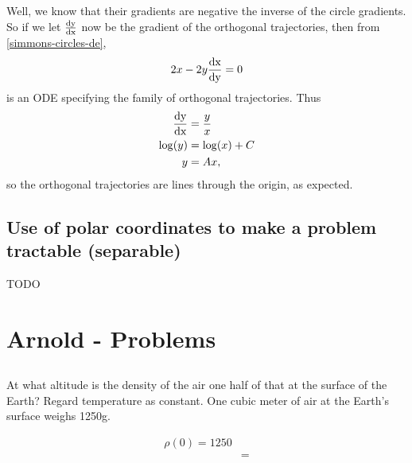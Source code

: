 Well, we know that their gradients are negative the inverse of the circle
gradients. So if we let $\frac{\operatorname{\text{dy}}}{\operatorname{\text{dx}}}$ now be the gradient of the orthogonal
trajectories, then from \eqref{simmons-circles-de},
\begin{align*}
  2x - 2y\frac{\operatorname{\text{dx}}}{\operatorname{\text{dy}}} = 0
\end{align*}
is an ODE specifying the family of orthogonal trajectories. Thus
\begin{align*}
  \frac{\operatorname{\text{dy}}}{\operatorname{\text{dx}}} &= \frac{y}{x}\\
  \log(y) &= \log(x) + C\\
       y &= Ax,
\end{align*}
so the orthogonal trajectories are lines through the origin, as expected.

\subsection{Use of polar coordinates to make a problem tractable (separable)}
TODO

\section{Arnold - Problems}
\subsection{}
\begin{mdframed}
  At what altitude is the density of the air one half of that at the surface of
  the Earth? Regard temperature as constant. One cubic meter of air at the
  Earth's surface weighs 1250g.
\end{mdframed}
\begin{align*}
  \rho(0) = 1250\\
  &=
\end{align*}